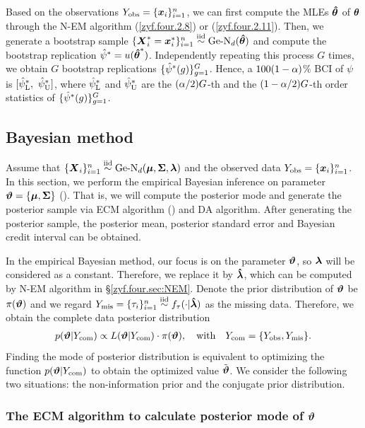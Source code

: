 Based on the observations $Y_{\rm obs} = \{{\boldsymbol{x}}_i\}_{i=1}^n$, we can first compute the MLEs $\boldsymbol{\hat{\theta}}$ of ${\boldsymbol{\theta}}$ through the N-EM algorithm (\ref{zyf.four.2.8}) or (\ref{zyf.four.2.11}). Then, we generate a bootstrap sample $\{{\boldsymbol{X}}_i^*= {\boldsymbol{x}}_i^*\}_{i=1}^n \stackrel{{\rm iid}}{\sim} \mbox{Ge-N}_d(\boldsymbol{\hat{\theta}})$ and compute the bootstrap replication $\hat{\psi}^* = u(\boldsymbol{\hat{\theta}}^*)$. Independently repeating this process $G$ times, we obtain $G$ bootstrap replications $\{\hat{\psi}^*(g)\}_{g=1}^G$. Hence, a $100(1-\alpha)$\% BCI of $\psi$ is $[\hat{\psi}_{\rm L}^*, \  \hat{\psi}_{\rm U}^*]$, where $\hat{\psi}_{\rm L}^*$ and $\hat{\psi}_{\rm U}^*$ are the $(\alpha/2)G$-th and the $(1-\alpha/2)G$-th order statistics of $\{\hat{\psi}^*(g)\}_{g=1}^G$.

\subsection{Bayesian method}\label{zyf.four.sec:Bayesian}        %

Assume that $\{{\boldsymbol{X}}_i\}_{i=1}^n \stackrel{{\rm iid}}{\sim} \mbox{Ge-N}_d({\boldsymbol{\mu}}, {\mbox{\boldmath$\Sigma$}}, {\boldsymbol{\lambda}})$ and the observed data $Y_{\rm obs} = \{{\boldsymbol{x}}_i\}_{i=1}^n$. In this section, we perform the empirical Bayesian inference on parameter $\boldsymbol{\vartheta} = \{{\boldsymbol{\mu}}, {\mbox{\boldmath$\Sigma$}}\}$ (\cite{BT1992}). That is, we will compute the posterior mode and generate the posterior sample via ECM algorithm (\cite{MR1993}) and DA algorithm. After generating the posterior sample, the posterior mean, posterior standard error and Bayesian credit interval can be obtained.

In the empirical Bayesian method, our focus is on the parameter $\boldsymbol{\vartheta}$, so ${\boldsymbol{\lambda}}$ will be considered as a constant. Therefore, we replace it by $\mbox{\boldmath${\hat \lambda}$}$, which can be computed by N-EM algorithm in \S\ref{zyf.four.sec:NEM}. Denote the prior distribution of $\boldsymbol{\vartheta}$ be $\pi(\boldsymbol{\vartheta})$ and we regard $Y_{\rm mis} = \{\tau_i\}_{i=1}^n \stackrel{{\rm iid}}{\sim} f_\tau(\cdot | \mbox{\boldmath${\hat \lambda}$})$ as the missing data. Therefore, we obtain the complete data posterior distribution
\begin{eqnarray}    \label{zyf.four.2.12}
    p(\boldsymbol{\vartheta} | Y_{\rm com}) \propto L(\boldsymbol{\vartheta} | Y_{\rm com}) \cdot \pi(\boldsymbol{\vartheta}), \quad \mbox{with} \quad Y_{\rm com} = \{Y_{\rm obs}, Y_{\rm mis}\}.
\end{eqnarray}
Finding the mode of posterior distribution is equivalent to optimizing the function $p(\boldsymbol{\vartheta} | Y_{\rm com})$ to obtain the optimized value $\tilde{\boldsymbol{\vartheta}}$. We consider the following two situations: the non-information prior and the conjugate prior distribution.

\subsubsection{The ECM algorithm to calculate posterior mode of $\boldsymbol{\vartheta}$}        %

